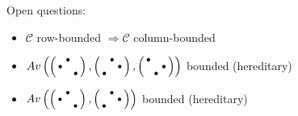 Open questions:
\begin{itemize}
	\item $\mathcal{C}$ row-bounded $\Rightarrow\mathcal{C}$ column-bounded
	\item $Av\left(\smm{ &\bullet& \\\bullet& & \\ & &\bullet},\smm{ &\bullet& \\ & &\bullet\\\bullet& & },\smm{\bullet& & \\ & &\bullet\\ &\bullet& }\right)$ bounded (hereditary)
	\item $Av\left(\smm{ &\bullet& \\\bullet& & \\ & &\bullet},\smm{ &\bullet& \\ & &\bullet\\\bullet& & }\right)$ bounded (hereditary)
\end{itemize}